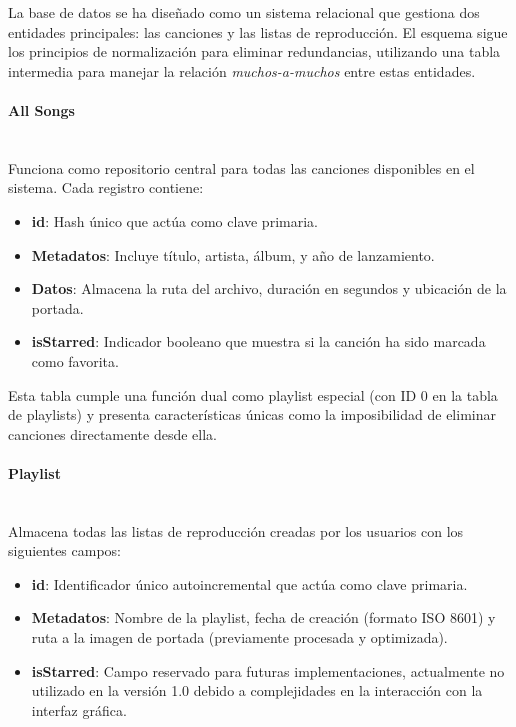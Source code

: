 \documentclass[11pt, a4paper]{article}
\begin{document}
            La base de datos se ha diseñado como un sistema relacional que gestiona dos entidades principales: las canciones y las listas de reproducción. El esquema sigue los principios de normalización para eliminar redundancias, utilizando una tabla intermedia para manejar la relación \textit{muchos-a-muchos} entre estas entidades.

              \paragraph{All Songs}
              ‎ \\

              Funciona como repositorio central para todas las canciones disponibles en el sistema. Cada registro contiene:

              \begin{itemize}
                \item \textbf{id}: Hash único que actúa como clave primaria.
                \item \textbf{Metadatos}: Incluye título, artista, álbum, y año de lanzamiento.
                \item \textbf{Datos}:  Almacena la ruta del archivo, duración en segundos y ubicación de la portada.
                \item \textbf{isStarred}: Indicador booleano que muestra si la canción ha sido marcada como favorita.
              \end{itemize}

              Esta tabla cumple una función dual como playlist especial (con ID 0 en la tabla de playlists) y presenta características únicas como la imposibilidad de eliminar canciones directamente desde ella.

              \paragraph{Playlist}
              ‎ \\

              Almacena todas las listas de reproducción creadas por los usuarios con los siguientes campos:

              \begin{itemize}
                \item \textbf{id}: Identificador único autoincremental que actúa como clave primaria.
                \item \textbf{Metadatos}: Nombre de la playlist, fecha de creación (formato ISO 8601) y ruta a la imagen de portada (previamente procesada y optimizada).
                \item \textbf{isStarred}: Campo reservado para futuras implementaciones, actualmente no utilizado en la versión 1.0 debido a complejidades en la interacción con la interfaz gráfica.
              \end{itemize}
\end{document}
